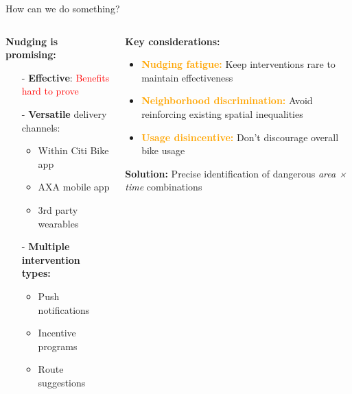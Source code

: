 \documentclass[aspectratio=169,xcolor={usenames,dvipsnames,svgnames,table},10pt,usepdftitle=false,hyperref={bookmarksdepth=3}]{beamer}
\begin{document}
\begin{frame}{How can we do something?}
    \begin{columns}
        \begin{column}{0.5\textwidth}
            \textbf{Nudging is promising:}
            
            \begin{itemize}
                \item[-] \textbf{Effective}: \textcolor{red}{Benefits hard to prove}
                \item[-] \textbf{Versatile} delivery channels:
                \begin{itemize}
                    \item Within Citi Bike app
                    \item AXA mobile app
                    \item 3rd party wearables
                \end{itemize}
                \item[-] \textbf{Multiple intervention types:}
                \begin{itemize}
                    \item Push notifications
                    \item Incentive programs
                    \item Route suggestions
                \end{itemize}
            \end{itemize}
        \end{column}
        
        \begin{column}{0.5\textwidth}
            \textbf{Key considerations:}
            \begin{itemize}
                \item \textcolor{orange}{\textbf{Nudging fatigue:}} Keep interventions rare to maintain effectiveness
                \item \textcolor{orange}{\textbf{Neighborhood discrimination:}} Avoid reinforcing existing spatial inequalities
                \item \textcolor{orange}{\textbf{Usage disincentive:}} Don't discourage overall bike usage
            \end{itemize}
            
            \vspace{0.3cm}
            
            \textbf{Solution:} Precise identification of dangerous \textit{area × time} combinations
        \end{column}
    \end{columns}
\end{frame}
\end{document}
